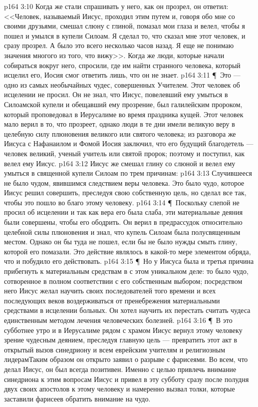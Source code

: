 \vs p164 3:10 Когда же стали спрашивать у него, как он прозрел, он ответил: <<Человек, называемый Иисус, проходил этим путем и, говоря обо мне со своими друзьями, смешал слюну с глиной, помазал мои глаза и велел, чтобы я пошел и умылся в купели Силоам. Я сделал то, что сказал мне этот человек, и сразу прозрел. А было это всего несколько часов назад. Я еще не понимаю значения многого из того, что вижу>>. Когда же люди, которые начали собираться вокруг него, спросили, где им найти странного человека, который исцелил его, Иосия смог ответить лишь, что он не знает.
\vs p164 3:11 \P\ Это --- одно из самых необычайных чудес, совершенных Учителем. Этот человек об исцелении не просил. Он не знал, что Иисус, повелевший ему умыться в Силоамской купели и обещавший ему прозрение, был галилейским пророком, который проповедовал в Иерусалиме во время праздника кущей. Этот человек мало верил в то, что прозреет, однако люди в те дни имели великую веру в целебную силу плюновения великого или святого человека; из разговора же Иисуса с Нафанаилом и Фомой Иосия заключил, что его будущий благодетель --- человек великий, ученый учитель или святой пророк; поэтому и поступил, как велел ему Иисус.
\vs p164 3:12 Иисус же смешал глину со слюной и велел ему умыться в священной купели Силоам по трем причинам:
\vs p164 3:13 \bibnobreakspace Случившееся не было чудом, явившимся следствием веры человека. Это было чудо, которое Иисус решил совершить, преследуя свою собственную цель, но сделал все так, чтобы это пошло во благо этому человеку.
\vs p164 3:14 \P\ \bibnobreakspace Поскольку слепой не просил об исцелении и так как вера его была слаба, эти материальные деяния были совершены, чтобы его ободрить. Он верил в предрассудок относительно целебной силы плюновения и знал, что купель Силоам была полусвященным местом. Однако он бы туда не пошел, если бы не было нужды смыть глину, которой его помазали. Это действие являлось в какой\hyp{}то мере элементом обряда, что и побудило его действовать.
\vs p164 3:15 \P\ \bibnobreakspace Но у Иисуса была и третья причина прибегнуть к материальным средствам в с этом уникальном деле: то было чудо, сотворенное в полном соответствии с его собственным выбором; посредством него Иисус желал научить своих последователей того времени и всех последующих веков воздерживаться от пренебрежения материальными средствами в исцелении больных. Он хотел научить их перестать считать чудеса единственным методом лечения человеческих болезней.
\vs p164 3:16 \P\ В это субботнее утро и в Иерусалиме рядом с храмом Иисус вернул этому человеку зрение чудесным деянием, преследуя главную цель --- превратить этот акт в открытый вызов синедриону и всем еврейским учителям и религиозным лидерам\. Таким образом он открыто заявил о разрыве с фарисеями. Во всем, что делал Иисус, он был всегда позитивен. Именно с целью привлечь внимание синедриона к этим вопросам Иисус и привел в эту субботу сразу после полудня двух своих апостолов к этому человеку и намеренно вызвал толки, которые заставили фарисеев обратить внимание на чудо.
